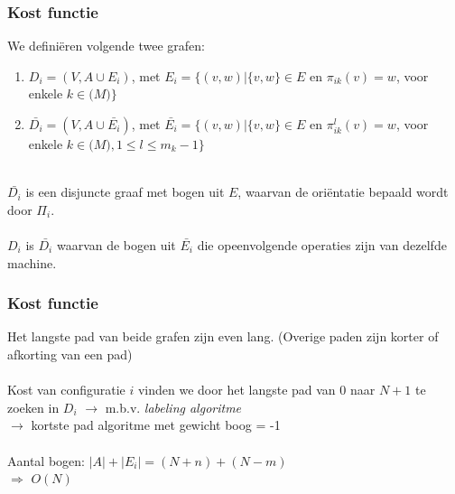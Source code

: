 \documentclass
   [kulak] %
   {kulakbeamer}
\newcommand\tab[1][1cm]{\hspace*{#1}}
\begin{document}
\begin{frame}
	\frametitle{Kost functie}
	We definiëren volgende twee grafen:\\
	\begin{enumerate}
		\item $D_i = (V, A \cup E_i)$, met $E_i = \{(v, w) | \{v, w\} \in E$ en 		$\pi_{ik}(v) = w$, voor enkele $k \in \mathscr(M)\}$\\
		\item $\bar{D_i} = (V, A \cup \bar{E_i})$, met $\bar{E_i} = \{(v, w) | \{v, w\} \in E$ en $\pi_{ik}^l(v) = w$, voor enkele $k \in \mathscr(M), 1 \le l \le m_k -1\}$
	\end{enumerate}
	~\\
	
	$\bar{D_i}$ is een disjuncte graaf met bogen uit $E$, waarvan de oriëntatie bepaald wordt door $\Pi_i$.\\ ~\\

	$D_i$ is $\bar{D_i}$ waarvan de bogen uit $\bar{E_i}$ die opeenvolgende operaties zijn van dezelfde machine.
	
	
\end{frame}

\begin{frame}
\frametitle{Kost functie}
	Het langste pad van beide grafen zijn even lang. (Overige paden zijn korter of afkorting van een pad)\\~\\
	\pause
	Kost van configuratie $i$ vinden we door het langste pad van $0$ naar $N + 1$ te zoeken in $D_i$ $\rightarrow$ m.b.v. \textit{labeling algoritme}\\\tab $\rightarrow$ 
	kortste pad algoritme met gewicht boog = -1
	\\~\\
	\pause
	Aantal bogen: $|A| + |E_i| = (N + n) + (N - m)$ \\
	\tab $\Rightarrow$ $O(N)$


\end{frame}
\end{document}
